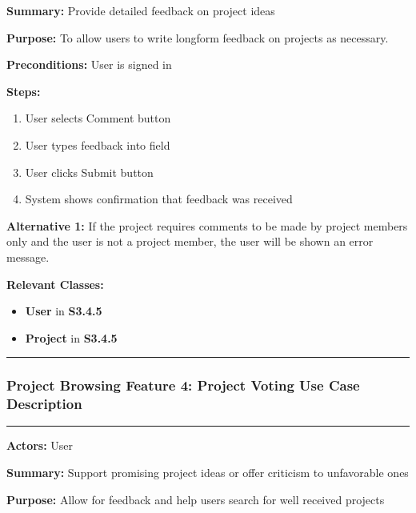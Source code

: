 \documentclass[twoside,letterpaper]{article}
\begin{document}
	\noindent\textbf{Summary:} Provide detailed feedback on project ideas  \newline
	
	\noindent\textbf{Purpose:} To allow users to write longform feedback on projects as necessary. \newline
	
	\noindent\textbf{Preconditions:} User is signed in \newline
	
	\noindent\textbf{Steps:} \begin{enumerate}
		\item User selects Comment button
		\item User types feedback into field
		\item User clicks Submit button
		\item System shows confirmation that feedback was received
	\end{enumerate}
	\noindent\textbf{Alternative 1:} If the project requires comments to be made by project members only and the user is not a project member, the user will be shown an error message. \newline
	
	
	\noindent\textbf{Relevant Classes:}
	\begin{itemize}
		\item \textbf{User} in \textbf{S3.4.5}
		\item \textbf{Project} in \textbf{S3.4.5}
	\end{itemize}
	\vspace{8pt}
	\hrule
	\newpage
	
	
	\subsubsection[Project Browsing Feature 4: Project Voting Use Case Description]{\rmfamily\bfseries\color{black}
	Project Browsing Feature 4: Project Voting Use Case Description}
	\hypertarget{RefHeading22059017292}{}
	
	\vspace{2pt}
	\hrule
	\vspace{8pt}
	\textbf{Actors:} User \newline
	
	\noindent\textbf{Summary:} Support promising project ideas or offer criticism to unfavorable ones  \newline
	
	\noindent\textbf{Purpose:} Allow for feedback and help users search for well received projects \newline
	
\end{document}
